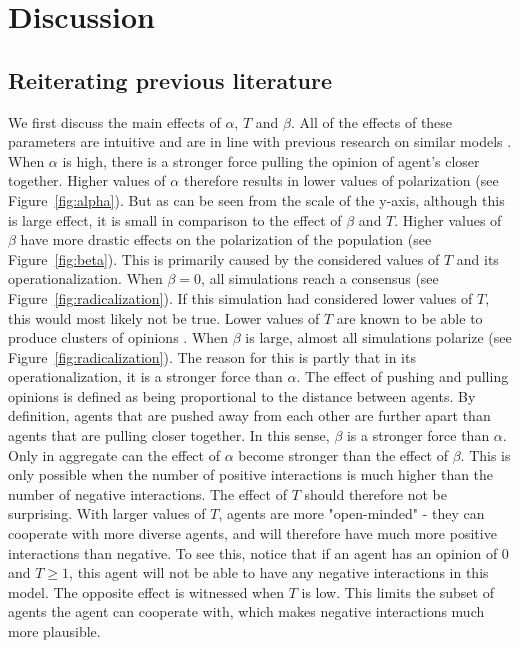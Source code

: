 \documentclass{article}
\begin{document}
\section{Discussion}

\subsection{Reiterating previous literature}

We first discuss the main effects of $\alpha$, $T$ and $\beta$. All of the effects of these parameters are intuitive and are in line with previous research on similar models \cite{flache_models_2017}. When $\alpha$ is high, there is a stronger force pulling the opinion of agent's closer together. Higher values of $\alpha$ therefore results in lower values of polarization (see Figure~\ref{fig:alpha}). 
But as can be seen from the scale of the y-axis, although this is large effect, it is small in comparison to the effect of $\beta$ and $T$. Higher values of $\beta$ have more drastic effects on the polarization of the population (see Figure~\ref{fig:beta}). 
This is primarily caused by the considered values of $T$ and its operationalization. When $\beta = 0$, all simulations reach a consensus (see Figure~\ref{fig:radicalization}). If this simulation had considered lower values of $T$, this would most likely not be true. Lower values of $T$ are known to be able to produce clusters of opinions \cite{flache_models_2017,sasahara_social_2021}. When $\beta$ is large, almost all simulations polarize (see Figure~\ref{fig:radicalization}). The reason for this is partly that in its operationalization, it is a stronger force than $\alpha$. The effect of pushing and pulling opinions is defined as being proportional to the distance between agents. 
By definition, agents that are pushed away from each other are further apart than agents that are pulling closer together. In this sense, $\beta$ is a stronger force than $\alpha$. Only in aggregate can the effect of $\alpha$ become stronger than the effect of $\beta$. This is only possible when the number of positive interactions is much higher than the number of negative interactions. The effect of $T$ should therefore not be surprising. With larger values of $T$, agents are more "open-minded" - they can cooperate with more diverse agents, and will therefore have much more positive interactions than negative. To see this, notice that if an agent has an opinion of 0 and $T\geq1$, this agent will not be able to have any negative interactions in this model. The opposite effect is witnessed when $T$ is low. This limits the subset of agents the agent can cooperate with, which makes negative interactions much more plausible.
\end{document}
